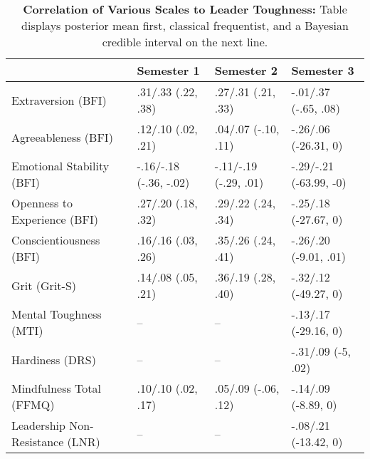 \begin{table}[ht]
\centering
\begin{tabular}{llll}
  \hline
 & Semester 1 & Semester 2 & Semester 3 \\ 
  \hline
Extraversion (BFI) & .31/.33 (.22, .38) & .27/.31 (.21, .33) & -.01/.37 (-.65, .08) \\ 
  Agreeableness (BFI) & .12/.10 (.02, .21) & .04/.07 (-.10, .11) & -.26/.06 (-26.31, 0) \\ 
  Emotional Stability (BFI) & -.16/-.18 (-.36, -.02) & -.11/-.19 (-.29, .01) & -.29/-.21 (-63.99, -0) \\ 
  Openness to Experience (BFI) & .27/.20 (.18, .32) & .29/.22 (.24, .34) & -.25/.18 (-27.67, 0) \\ 
  Conscientiousness (BFI) & .16/.16 (.03, .26) & .35/.26 (.24, .41) & -.26/.20 (-9.01, .01) \\ 
  Grit (Grit-S) & .14/.08 (.05, .21) & .36/.19 (.28, .40) & -.32/.12 (-49.27, 0) \\ 
  Mental Toughness (MTI) & -- & -- & -.13/.17 (-29.16, 0) \\ 
  Hardiness (DRS) & -- & -- & -.31/.09 (-5, .02) \\ 
  Mindfulness Total (FFMQ) & .10/.10 (.02, .17) & .05/.09 (-.06, .12) & -.14/.09 (-8.89, 0) \\ 
  Leadership Non-Resistance (LNR) & -- & -- & -.08/.21 (-13.42, 0) \\ 
   \hline
\end{tabular}
\caption{\textbf{Correlation of Various Scales to Leader Toughness:} Table displays posterior mean first, classical frequentist, and a Bayesian credible interval on the next line.} 
\label{tab:pers_corr}
\end{table}
